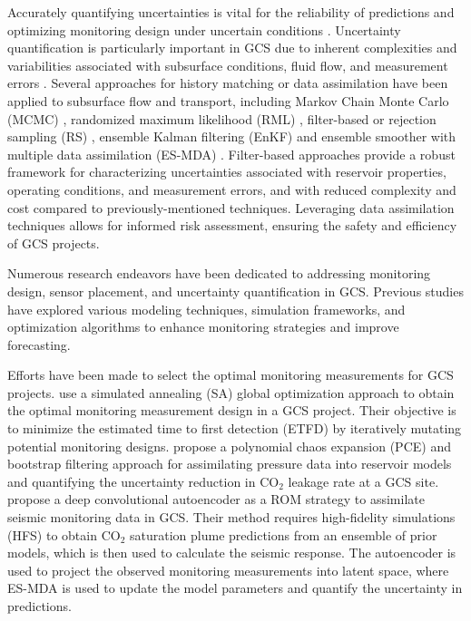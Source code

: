 \documentclass[a4paper,fleqn]{cas-sc}
\begin{document}
Accurately quantifying uncertainties is vital for the reliability of predictions and optimizing monitoring design under uncertain conditions \citep{Zhu2018415, Wang2021, Mohamed201031, Chen2017328, Cremon2020, Bellenfant20092447, Sun2019, Li2011, Nordbotten2012234}. Uncertainty quantification is particularly important in GCS due to inherent complexities and variabilities associated with subsurface conditions, fluid flow, and measurement errors \citep{Jia2018104, Chen2020, Jeong20133771, Jayne2019128}. Several approaches for history matching or data assimilation have been applied to subsurface flow and transport, including Markov Chain Monte Carlo (MCMC) \citep{Emerick2012418, Liu2003188, Chen2016, Chen2017328, Cremon2020}, randomized maximum likelihood (RML) \citep{Chen20121}, filter-based or rejection sampling (RS) \citep{bhark2014assisted, park2013history, ma2008efficient, Caers2011}, ensemble Kalman filtering (EnKF) \citep{Chen2010579, Chang20108011, tavakoli2013comparison, dawuda2022geologic, Ma2019199} and ensemble smoother with multiple data assimilation (ES-MDA) \citep{Rafiee2017, Chen2020, jahandideh2021inference, tadjer2021managing, jiang2021data, liu20213d, misra2022deep}. Filter-based approaches provide a robust framework for characterizing uncertainties associated with reservoir properties, operating conditions, and measurement errors, and with reduced complexity and cost compared to previously-mentioned techniques. Leveraging data assimilation techniques allows for informed risk assessment, ensuring the safety and efficiency of GCS projects. 

Numerous research endeavors have been dedicated to addressing monitoring design, sensor placement, and uncertainty quantification in GCS. Previous studies have explored various modeling techniques, simulation frameworks, and optimization algorithms to enhance monitoring strategies and improve forecasting. 

Efforts have been made to select the optimal monitoring measurements for GCS projects. \citet{Yonkofski2016} use a simulated annealing (SA) global optimization approach to obtain the optimal monitoring measurement design in a GCS project. Their objective is to minimize the estimated time to first detection (ETFD) by iteratively mutating potential monitoring designs. \citet{Oladyshkin2013671} propose a polynomial chaos expansion (PCE) and bootstrap filtering approach for assimilating pressure data into reservoir models and quantifying the uncertainty reduction in CO$_2$ leakage rate at a GCS site. \citet{Liu2020} propose a deep convolutional autoencoder as a ROM strategy to assimilate seismic monitoring data in GCS. Their method requires high-fidelity simulations (HFS) to obtain CO$_2$ saturation plume predictions from an ensemble of prior models, which is then used to calculate the seismic response. The autoencoder is used to project the observed monitoring measurements into latent space, where ES-MDA is used to update the model parameters and quantify the uncertainty in predictions. 
\end{document}
